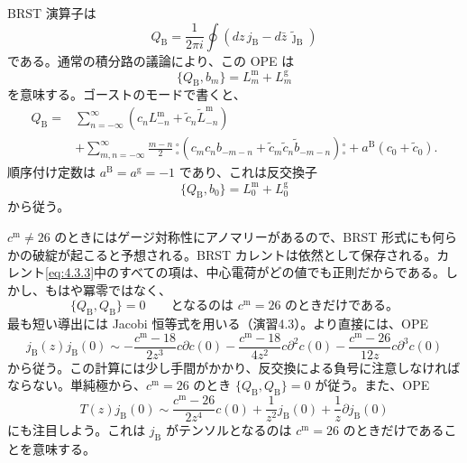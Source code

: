 BRST 演算子は
\begin{equation}
Q_{\mathrm B}=\frac1{2\pi i}\oint
(dz\,j_{\mathrm B}-d\bar z\,\widetilde{\jmath}_{\mathrm B})
\tag{4.3.5}\label{eq:4.3.5}
\end{equation}
である。通常の積分路の議論により、この OPE は
\begin{equation}
\{Q_{\mathrm B},b_m\}=L^{\mathrm m}_m+L^{\mathrm g}_m
\tag{4.3.6}\label{eq:4.3.6}
\end{equation}
を意味する。ゴーストのモードで書くと、
\begin{equation}
\begin{aligned}
Q_{\mathrm B}
={}&\sum_{n=-\infty}^{\infty}
(c_nL^{\mathrm m}_{-n}+\widetilde c_n\widetilde L^{\mathrm m}_{-n})\\
&+\sum_{m,n=-\infty}^{\infty}\frac{m-n}{2}\,
{}^\circ_\circ
(c_mc_nb_{-m-n}+\widetilde c_m\widetilde c_n\widetilde b_{-m-n})
{}^\circ_\circ
+a^{\mathrm B}(c_0+\widetilde c_0).
\end{aligned}
\tag{4.3.7}\label{eq:4.3.7}
\end{equation}
順序付け定数は $a^{\mathrm B}=a^{\mathrm g}=-1$ であり、これは反交換子
\begin{equation}
\{Q_{\mathrm B},b_0\}=L^{\mathrm m}_0+L^{\mathrm g}_0
\tag{4.3.8}\label{eq:4.3.8}
\end{equation}
から従う。

$c^{\mathrm m}\neq26$ のときにはゲージ対称性にアノマリーがあるので、BRST 形式にも何らかの破綻が起こると予想される。BRST カレントは依然として保存される。カレント\eqref{eq:4.3.3}中のすべての項は、中心電荷がどの値でも正則だからである。しかし、もはや冪零ではなく、
\begin{equation}
\{Q_{\mathrm B},Q_{\mathrm B}\}=0
\qquad\text{となるのは }c^{\mathrm m}=26\text{ のときだけである。}
\tag{4.3.9}\label{eq:4.3.9}
\end{equation}
最も短い導出には Jacobi 恒等式を用いる（演習4.3）。より直接には、OPE
\begin{equation}
j_{\mathrm B}(z)j_{\mathrm B}(0)\sim
-\frac{c^{\mathrm m}-18}{2z^3}c\partial c(0)
-\frac{c^{\mathrm m}-18}{4z^2}c\partial^2c(0)
-\frac{c^{\mathrm m}-26}{12z}c\partial^3c(0)
\tag{4.3.10}\label{eq:4.3.10}
\end{equation}
から従う。この計算には少し手間がかかり、反交換による負号に注意しなければならない。単純極から、$c^{\mathrm m}=26$ のとき $\{Q_{\mathrm B},Q_{\mathrm B}\}=0$ が従う。また、OPE
\begin{equation}
T(z)j_{\mathrm B}(0)\sim
\frac{c^{\mathrm m}-26}{2z^4}c(0)
+\frac1{z^2}j_{\mathrm B}(0)+\frac1z\partial j_{\mathrm B}(0)
\tag{4.3.11}\label{eq:4.3.11}
\end{equation}
にも注目しよう。これは $j_{\mathrm B}$ がテンソルとなるのは $c^{\mathrm m}=26$ のときだけであることを意味する。


